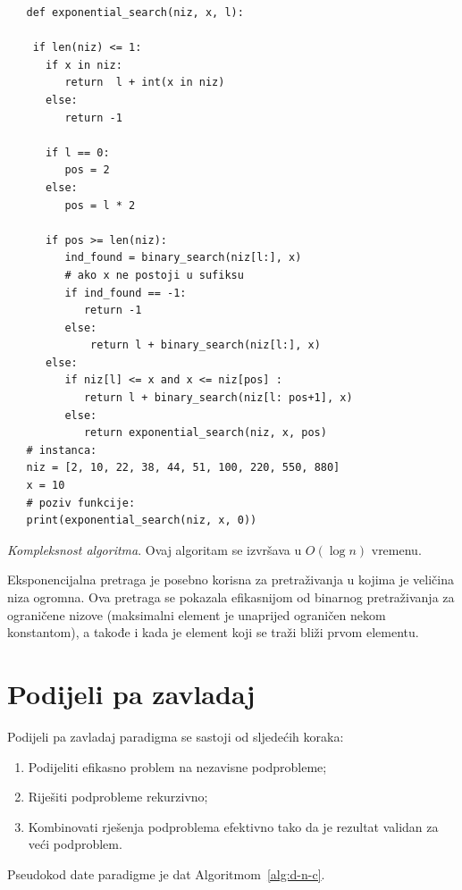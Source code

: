    \begin{verbatim}
   def exponential_search(niz, x, l):
   
   	if len(niz) <= 1:
   	  if x in niz:
   		 return  l + int(x in niz)
   	  else:
  		 return -1 
   
   	  if l == 0:
   		 pos = 2
   	  else:
   		 pos = l * 2
   
   	  if pos >= len(niz):
   		 ind_found = binary_search(niz[l:], x)
		 # ako x ne postoji u sufiksu
   		 if ind_found == -1:  
   			return -1
   		 else:
   			 return l + binary_search(niz[l:], x)
   	  else:
   		 if niz[l] <= x and x <= niz[pos] :
   		    return l + binary_search(niz[l: pos+1], x)
   		 else:
   		    return exponential_search(niz, x, pos)
   # instanca:
   niz = [2, 10, 22, 38, 44, 51, 100, 220, 550, 880]
   x = 10
   # poziv funkcije: 
   print(exponential_search(niz, x, 0))
   \end{verbatim}

\textit{Kompleksnost algoritma}.  Ovaj algoritam se izvršava u $O(\log n)$ vremenu. 
 

Eksponencijalna pretraga je posebno korisna za pretraživanja u kojima je  veličina niza ogromna.  Ova pretraga se pokazala efikasnijom   od binarnog pretraživanja za ograničene nizove (maksimalni element je unaprijed ograni\-čen nekom konstantom), a takođe i kada je element koji se traži bliži prvom elementu.

\section{Podijeli pa zavladaj}
Podijeli pa zavladaj paradigma se sastoji od sljedećih koraka:
\begin{enumerate}
	\item  Podijeliti efikasno problem   na nezavisne podprobleme;
	\item Riješiti podprobleme rekurzivno;
	\item  Kombinovati rješenja podproblema efektivno tako da je rezultat validan za veći podproblem.
\end{enumerate}

Pseudokod date paradigme je dat  Algoritmom~\ref{alg:d-n-c}. 

  

